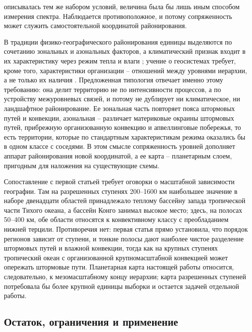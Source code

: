 \documentclass[12pt,a4paper]{article}
\begin{document}
описывалась тем же набором условий, величина была бы лишь иным способом измерения спектра. Наблюдается противоположное, и потому сопряженность может служить самостоятельной координатой районирования.

В традиции физико-географического районирования единицы выделяются по сочетанию зональных и азональных факторов, а климатический признак входит в их характеристику через режим тепла и влаги \cite{Isachenko1991}; учение о геосистемах требует, кроме того, характеристики организации -- отношений между уровнями иерархии, а не только их наличия \cite{Sochava1978,Puzachenko2010}. Предложенная типология отвечает именно этому требованию: она делит территорию не по интенсивности процессов, а по устройству межуровневых связей, и потому не дублирует ни климатическое, ни ландшафтное районирование. Ее зональная часть повторяет пояса штормовых путей и конвекции, азональная -- различает материковые окраины штормовых путей, прибрежную организованную конвекцию и апвеллинговые побережья, то есть территории, которые по стандартным характеристикам режима оказались бы в одном классе с соседями. В этом смысле сопряженность уровней дополняет аппарат районирования новой координатой, а ее карта -- планетарным слоем, пригодным для наложения на существующие схемы.

Сопоставление с первой статьей требует оговорки о масштабной зависимости географии. Там на разрешенных ступенях 200--1600 км наибольшее значение в наборе двенадцати областей принадлежало теплому бассейну запада тропической части Тихого океана, а бассейн Конго занимал высокое место; здесь, на полосах 50--400 км, обе области относятся к конвективному классу с преобладанием нижней терцили. Противоречия нет: первая статья прямо установила, что порядок регионов зависит от ступени, и тонкие полосы дают наиболее чистое разделение штормовых путей и влажной конвекции, тогда как на крупных ступенях тропический океан с организованной крупномасштабной конвекцией может опережать штормовые пути. Планетарная карта настоящей работы относится, следовательно, к мезомасштабному концу иерархии; карта разрешенных ступеней потребовала бы более крупной единицы выборки и остается задачей отдельной работы.

\subsection{Остаток, ограничения и применение}
\end{document}
